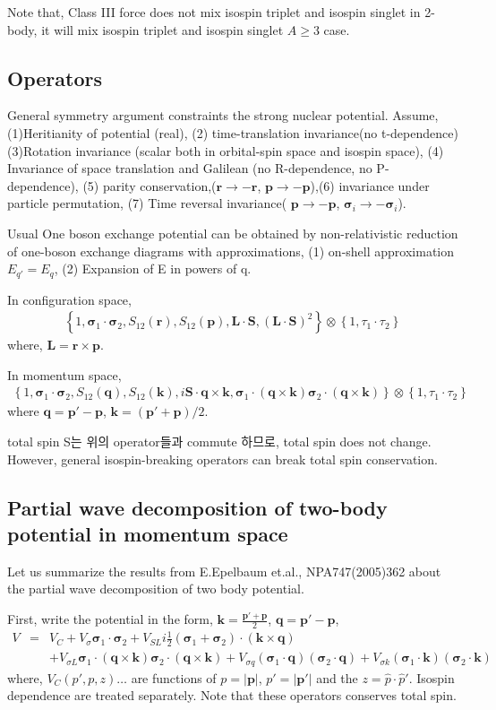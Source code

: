 \documentclass[10pt]{article}
\def\bm{\boldsymbol}
\newcommand{\bea}{\begin{eqnarray}}
\newcommand{\eea}{\end{eqnarray}}
\newcommand{\no}{\nonumber \\}
\def\vs{{\bm \sigma}}
\def\vp{{\bm p}}
\def\vq{{\bm q}}
\def\vk{{\bm k}}
\def\vr{{\bm r}}
\begin{document}
Note that, Class III force does not mix isospin triplet and
isospin singlet in 2-body, it will mix isospin triplet and isospin singlet $A\geq 3$ case.

\subsection{Operators}
General symmetry argument constraints the strong nuclear potential.
Assume, (1)Heritianity of potential (real), (2) time-translation invariance(no t-dependence)
(3)Rotation invariance (scalar both in orbital-spin space and isospin space),
(4) Invariance of space translation and Galilean (no R-dependence, no P-dependence),
(5) parity conservation,($\vr\to -\vr$, $\vp\to -\vp$),(6) invariance under particle
permutation,  (7) Time reversal invariance(
$\vp\to -\vp$, ${\bm\sigma}_i\to -{\bm\sigma}_i$).

Usual One boson exchange potential can be obtained by non-relativistic reduction
of one-boson exchange diagrams with approximations,
(1) on-shell approximation $E_{q'}=E_q$, (2) Expansion of E in powers of q.

In configuration space,
\bea
\left\{ 1,\vs_1\cdot\vs_2, S_{12}(\vr),S_{12}(\vp),
        {\bm L}\cdot{\bm S},({\bm L}\cdot{\bm S})^2 
\right\}\otimes\left\{1,\tau_1\cdot\tau_2 \right\}
\eea
where, ${\bm L}=\vr\times\vp$.

In momentum space,
\bea
\left\{ 1,\vs_1\cdot\vs_2, S_{12}(\vq),S_{12}(\vk),
        i{\bm S}\cdot\vq\times\vk, 
         \vs_1\cdot(\vq\times\vk)\vs_2\cdot(\vq\times\vk)    
\right\}\otimes\left\{1,\tau_1\cdot\tau_2 \right\}
\eea
where $\vq=\vp'-\vp$, $\vk=(\vp'+\vp)/2$.

total spin S는 위의 operator들과 commute 하므로,  total spin does not change. However, general isospin-breaking operators
can break total spin conservation.

\subsection{Partial wave decomposition of two-body 
potential in momentum space}
Let us summarize the results from E.Epelbaum et.al., NPA747(2005)362
about the partial wave decomposition of two body potential.

First, write the potential in the form,
$\vk=\frac{\vp'+\vp}{2}$, $\vq=\vp'-\vp$,
\bea
V&=&V_C+V_\sigma\vs_1\cdot\vs_2
   +V_{SL} i\frac{1}{2}(\vs_1+\vs_2)\cdot(\vk\times\vq)
   \no & &
   +V_{\sigma L}\vs_1\cdot(\vq\times\vk)\vs_2\cdot(\vq\times\vk)
   +V_{\sigma q}(\vs_1\cdot\vq)(\vs_2\cdot\vq)
   +V_{\sigma k}(\vs_1\cdot\vk)(\vs_2\cdot\vk)
\eea
where, $V_C(p',p,z)\dots$ are functions of
$p=|\vp|$, $p'=|\vp'|$ and the $z=\hat{p}\cdot\hat{p}'$.
Isospin dependence are treated separately.
Note that these operators conserves total spin.
\end{document}
